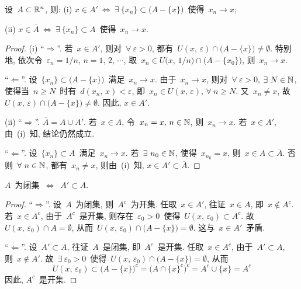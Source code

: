 \begin{proposition} \label{prop1.4.5}
设~$A \subset \mathbb{R}^n$, 则:
(i) $x \in A'~\Leftrightarrow~\exists~\{x_n\} \subset \big(A - \{x\}\big)$~使得~$x_n \rightarrow x$;

(ii) $x \in \overline{A}~\Leftrightarrow~\exists~\{x_n\} \subset A$~使得~$x_n \rightarrow x$.
\end{proposition}

\begin{proof}
(i) ``$\Rightarrow$''. 若~$x \in A'$, 则对~$\forall~\varepsilon > 0$, 都有~$U(x,\,\varepsilon) \cap \big(A - \{x\}\big) \neq \emptyset$. 特别地, 依次令~$\varepsilon_n = 1/n, \, n =1,\,2,\,\cdots$, 取~$x_n \in U\big(x,\,1/n\big) \cap \big(A - \{x_0\}\big)$, 则~$x_n \rightarrow x$.

``$\Leftarrow$''. 设~$\{x_n\} \subset \big(A - \{x\}\big)$~满足~$x_n \rightarrow x$. 由于~$x_n \rightarrow x$, 则对~$\forall~\varepsilon > 0$, $\exists~N \in \mathbb{N}$, 使得当~$n \geqslant N$~时有~$d(x_n,\,x) < \varepsilon$, 即~$x_n \in U(x,\,\varepsilon), \, \forall~n \geqslant N$. 又~$x_n \neq x$, 故~$U(x,\,\varepsilon) \cap \big(A - \{x\}\big) \neq \emptyset$. 因此, $x \in A'$.

(ii) ``$\Rightarrow$''. $\overline{A} = A \cup A'$. 若~$x \in A$, 令~$x_n = x, \, n \in \mathbb{N}$, 则~$x_n \rightarrow x$. 若~$x \in A'$, 由~(i)~知, 结论仍然成立.


``$\Leftarrow$''. 设~$\{x_n\} \subset A$~满足~$x_n \rightarrow x$. 若~$\exists~n_0 \in \mathbb{N}$, 使得~$x_{n_0} = x$, 则~$x \in A \subset \overline{A}$. 否则~$\forall~n \in \mathbb{N}$, 都有~$x_n \neq x$, 则由~(i)~知, $x \in A' \subset \overline{A}$.
\end{proof}

\begin{theorem} \label{thm1.4.3}
$A$~为闭集~$\Leftrightarrow$~$A' \subset A$.
\end{theorem}

\begin{proof}
``$\Rightarrow$''. 设~$A$~为闭集, 则~$A^c$~为开集. 任取~$x \in A'$, 往证~$x \in A$, 即~$x \notin A^c$. 若~$x \in A^c$, 由于~$A^c$~是开集, 则存在~$\varepsilon_0 > 0$~使得~$U(x,\,\varepsilon_0) \subset A^c$. 故~$U(x,\,\varepsilon_0) \cap A = \emptyset$, 从而~$U(x,\,\varepsilon_0) \cap \big(A - \{x\}\big) = \emptyset$. 这与~$x \in A'$~矛盾.

``$\Leftarrow$''. 设~$A' \subset A$, 往证~$A$~是闭集, 即~$A^c$~是开集. 任取~$x \in A^c$, 由于~$A' \subset A$, 则~$x \notin A'$. 故~$\exists~\varepsilon_0 > 0$~使得~$U(x,\,\varepsilon_0) \cap \big( A - \{x\} \big) = \emptyset$, 从而
\[
U(x,\,\varepsilon_0) \subset \big( A - \{x\} \big)^c = \big( A \cap \{x\}^c \big)^c = A^c \cup \{x\} =A^c
\]
因此, $A^c$~是开集.
\end{proof}


